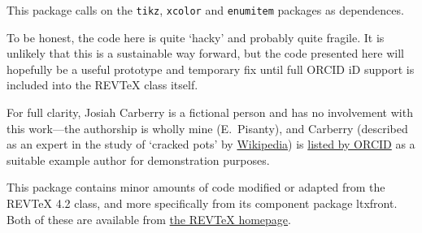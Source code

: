 \documentclass[%
  reprint,
  aps,
  pra,
  superscriptaddress,
  a4paper,
]{revtex4-2}
\begin{document}
This package calls on the \texttt{tikz}, \texttt{xcolor} and \texttt{enumitem} packages as dependences.

To be honest, the code here is quite `hacky' and probably quite fragile.
It is unlikely that this is a sustainable way forward, but the code presented here will hopefully be a useful prototype and temporary fix until full ORCID iD support is included into the REVTeX class itself.

For full clarity, Josiah Carberry is a fictional person and has no involvement with this work---the authorship is wholly mine (E.\ Pisanty), and Carberry (described as an expert in the study of `cracked pots' by \href{https://en.wikipedia.org/wiki/Josiah_S._Carberry}{Wikipedia}) is \href{https://support.orcid.org/hc/en-us/articles/360006897674-Structure-of-the-ORCID-Identifier}{listed by ORCID} as a suitable example author for demonstration purposes.

This package contains minor amounts of code modified or adapted from the REVTeX 4.2 class, and more specifically from its component package ltxfront. Both of these are available from \href{https://journals.aps.org/revtex}{the REVTeX homepage}.

\listoforcidids
\end{document}
